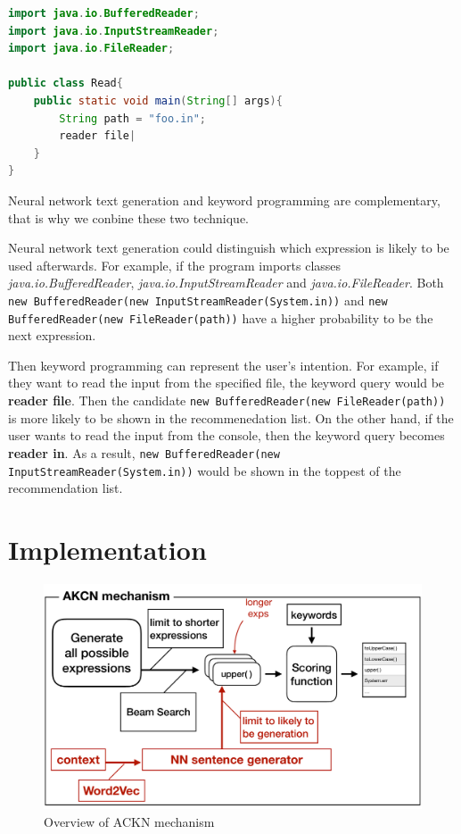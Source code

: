 \documentclass[PRO,english]{ipsj}
\begin{document}
\begin{lstlisting}[language=Java]
import java.io.BufferedReader;
import java.io.InputStreamReader;
import java.io.FileReader;

public class Read{
    public static void main(String[] args){
        String path = "foo.in";
        reader file|
    }
}
\end{lstlisting}
 
 Neural network text generation and keyword programming are complementary, that is why we conbine these two technique. 

 Neural network text generation could distinguish which expression is likely to be used afterwards. For example, if the program imports classes \textit{java.io.BufferedReader}, \textit{java.io.InputStreamReader} and \textit{java.io.FileReader}. Both \texttt{new BufferedReader(new InputStreamReader(System.in))} and \texttt{new BufferedReader(new FileReader(path))} have a higher probability to be the next expression.

 Then keyword programming can represent the user's intention. For example, if they want to read the input from the specified file, the keyword query would be \textbf{reader file}. Then the candidate \texttt{new BufferedReader(new FileReader(path))} is more likely to be shown in the recommenedation list. On the other hand, if the user wants to read the input from the console, then the keyword query becomes \textbf{reader in}. As a result, \texttt{new BufferedReader(new InputStreamReader(System.in))} would be shown in the toppest of the recommendation list.

\section{Implementation}\label{sec:implementation}

\begin{figure}[!ht]
\centering
\includegraphics[scale=0.3]{Figure/Overview.pdf}
\caption{Overview of ACKN mechanism}
\label{fig:overview}
\end{figure}
\end{document}
